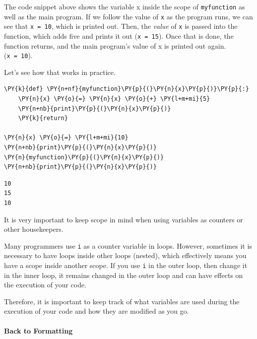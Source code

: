 The code snippet above shows the variable x inside the scope of
\texttt{myfunction} as well as the main program. If we follow the value
of \texttt{x} as the program runs, we can see that \texttt{x\ =\ 10},
which is printed out. Then, the \emph{value} of \texttt{x} is passed
into the function, which adds five and prints it out
(\texttt{x\ =\ 15}). Once that is done, the function returns, and the
main program's value of x is printed out again. (\texttt{x\ =\ 10}).

Let's see how that works in practice.

    \begin{tcolorbox}[breakable, size=fbox, boxrule=1pt, pad at break*=1mm,colback=cellbackground, colframe=cellborder]
\begin{Verbatim}[commandchars=\\\{\}]
\PY{k}{def} \PY{n+nf}{myfunction}\PY{p}{(}\PY{n}{x}\PY{p}{)}\PY{p}{:}
    \PY{n}{x} \PY{o}{=} \PY{n}{x} \PY{o}{+} \PY{l+m+mi}{5}
    \PY{n+nb}{print}\PY{p}{(}\PY{n}{x}\PY{p}{)}
    \PY{k}{return}

\PY{n}{x} \PY{o}{=} \PY{l+m+mi}{10}
\PY{n+nb}{print}\PY{p}{(}\PY{n}{x}\PY{p}{)}
\PY{n}{myfunction}\PY{p}{(}\PY{n}{x}\PY{p}{)}
\PY{n+nb}{print}\PY{p}{(}\PY{n}{x}\PY{p}{)}
\end{Verbatim}
\end{tcolorbox}

    \begin{Verbatim}[commandchars=\\\{\}]
10
15
10
    \end{Verbatim}

    It is very important to keep scope in mind when using variables as
counters or other housekeepers.

Many programmers use \texttt{i} as a counter variable in loops. However,
sometimes it is necessary to have loops inside other loops (nested),
which effectively means you have a scope inside another scope. If you
use \texttt{i} in the outer loop, then change it in the inner loop, it
remains changed in the outer loop and can have effects on the execution
of your code.

Therefore, it is important to keep track of what variables are used
during the execution of your code and how they are modified as you go.

\hypertarget{back-to-formatting}{%
\paragraph{Back to Formatting}\label{back-to-formatting}}

